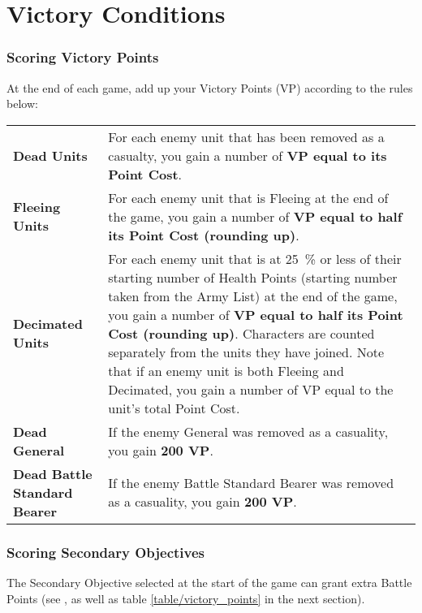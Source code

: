 \part{Victory Conditions}
\label{victory_conditions}

\section{Scoring Victory Points}
\label{scoring_victory_points}

At the end of each game, add up your Victory Points (VP) according to the rules below:

\vspace*{5pt}
\noindent\begin{tabular}{>{\bfseries\raggedleft}p{2.7cm}p{13.2cm}}

    Dead Units  &%
    For each enemy unit that has been removed as a casualty, you gain a number of \textbf{VP equal to its Point Cost}.\\
    Fleeing Units &%
    For each enemy unit that is Fleeing at the end of the game, you gain a number of \textbf{VP equal to half its Point Cost (rounding up)}.\\
    Decimated Units &%
    For each enemy unit that is at \SI{25}{\percent} or less of their starting number of Health Points (starting number taken from the Army List) at the end of the game, you gain a number of \textbf{VP equal to half its Point Cost (rounding up)}. Characters are counted separately from the units they have joined. Note that if an enemy unit is both Fleeing and Decimated, you gain a number of VP equal to the unit's total Point Cost.\\
    Dead General &%
    If the enemy General was removed as a casuality, you gain \textbf{200 VP}. \\
    Dead Battle Standard Bearer &%
    If the enemy Battle Standard Bearer was removed as a casuality, you gain \textbf{200 VP}.\\
\end{tabular}

\section{Scoring Secondary Objectives}
\label{scoring_secondary_objectives}

The Secondary Objective selected at the start of the game can grant extra Battle Points (see , as well as table \ref{table/victory_points} in the next section).

